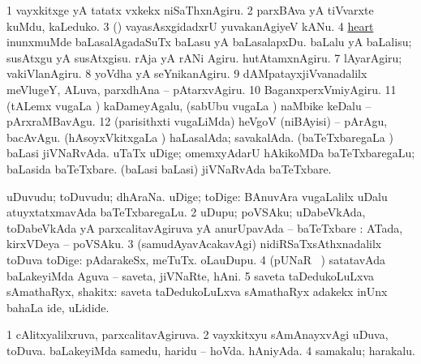\noindent 
\gl{\pagu}
\expl{}
\bmng
\bnum
\num{1}  vayxkitxge yA tatatx vxkekx niSaThxnAgiru. 
\num{2}  parxBAva yA tiVvarxte kuMdu, kaLeduko. 
\num{3}  (\AmA) vayasAsxgidadxrU yuvakanAgiyeV kANu. 
\num{4}  \hyperref{kandict_h.pdf}{H}{heart nuga(34)}{heart}  
  
\banum
{} inunxmuMde baLasalAgadaSuTx baLasu yA baLasalapxDu. 
 baLalu yA baLalisu; susAtxgu yA susAtxgisu. 
\eanum
\numie
{}  
\banum
{} rAja yA rANi Agiru. 
 hutAtamxnAgiru. 
\eanum
\numie
\num{7}  lAyarAgiru; vakiVlanAgiru. 
\num{8}  yoVdha yA seYnikanAgiru. 
\num{9}  dAMpatayxjiVvanadalilx meVlugeY, ALuva, parxdhAna -- pAtarxvAgiru. 
\num{10}  BaganxperxVmiyAgiru. 
\num{11}  (tALemx \mo vugaLa \vi) kaDameyAgalu, (sabUbu \mo vugaLa \vi) naMbike keDalu -- pArxraMBavAgu. 
\num{12}  (parisithxti \mo vugaLiMda) heVgoV (niBAyisi) -- pArAgu, bacAvAgu. 
  
\banum
{} (hAsoyxVkitxgaLa \vi) haLasalAda; savakalAda. 
 (baTeTxbaregaLa \vi) baLasi jiVNaRvAda. 
\eanum
\numie
{}  
\banum
{} uTaTx uDige; omemxyAdarU hAkikoMDa baTeTxbaregaLu; baLasida baTeTxbare. 
 (baLasi baLasi) jiVNaRvAda baTeTxbare. 
\eanum
\numie
\enum
\emng
\eentry

\bentry
{} 
\gl{\nA}
\expl{}
\bmng
\bnum
{} 
\banum
{} uDuvudu; toDuvudu; dhAraNa. 
 uDige; toDige:  BAnuvAra \mo vugaLalilx uDalu atuyxtatxmavAda baTeTxbaregaLu. 
\eanum
\numie
\num{2} uDupu; poVSAku; uDabeVkAda, toDabeVkAda yA parxcalitavAgiruva yA anurUpavAda -- baTeTxbare :  ATada, kirxVDeya -- poVSAku. 
\num{3} (samudAyavAcakavAgi) nidiRSaTxsAthxnadalilx toDuva toDige:  pAdarakeSx, meTuTx.  oLauDupu. 
\num{4} (pUNaR \parx\ ) satatavAda baLakeyiMda Aguva -- saveta, jiVNaRte, hAni. 
\num{5} saveta taDedukoLuLxva sAmathaRyx, shakitx:  saveta taDedukoLuLxva sAmathaRyx adakekx inUnx bahaLa ide, uLidide. 
\enum
\emng

\noindent 
\gl{\pagu}
\expl{}
\bmng
\bnum
\num{1}  cAlitxyalilxruva, parxcalitavAgiruva. 
\num{2}  vayxkitxyu sAmAnayxvAgi uDuva, toDuva. 
  
\banum
{} baLakeyiMda samedu, haridu -- hoVda. 
 hAniyAda. 
\eanum
\numie
\num{4}  samakalu; harakalu. 
\enum
\emng
\eentry

